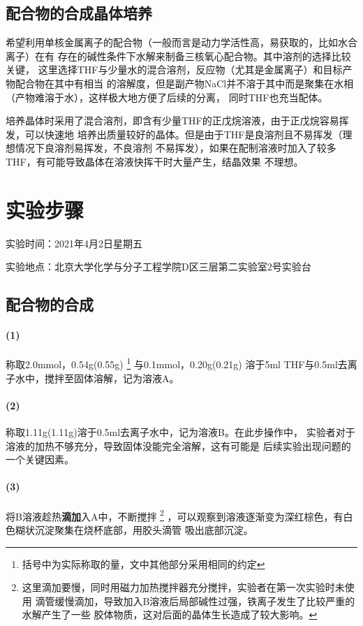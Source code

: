 \documentclass[a4paper,zihao=5,UTF8]{ctexart}
\begin{document}
	\subsection{配合物的合成晶体培养}
	希望利用单核金属离子的配合物（一般而言是动力学活性高，易获取的，比如水合离子）在有
	存在的碱性条件下水解来制备三核氧心配合物。其中溶剂的选择比较关键，
	这里选择THF与少量水的混合溶剂，反应物（尤其是金属离子）和目标产物配合物在其中有相当
	的溶解度，但是副产物NaCl并不溶于其中而是聚集在水相（产物难溶于水），这样极大地方便了后续的分离，
	同时THF也充当配体。
	\par 
	培养晶体时采用了混合溶剂，即含有少量THF的正戊烷溶液，由于正戊烷容易挥发，可以快速地
	培养出质量较好的晶体。但是由于THF是良溶剂且不易挥发（理想情况下良溶剂易挥发，不良溶剂
	不易挥发），如果在配制溶液时加入了较多THF，有可能导致晶体在溶液快挥干时大量产生，结晶效果
	不理想。
	\section{实验步骤}
	实验时间：2021年4月2日星期五\\
	\par 
	实验地点：北京大学化学与分子工程学院D区三层第二实验室2号实验台
	\subsection{配合物的合成}
	\paragraph{(1)}称取2.0mmol，0.54g(0.55g)
	\footnote{括号中为实际称取的量，文中其他部分采用相同的约定}
	与0.1mmol，0.20g(0.21g)
	溶于5ml THF与0.5ml去离子水中，搅拌至固体溶解，记为溶液A。
	\paragraph{(2)}
	称取1.11g(1.11g)溶于0.5ml去离子水中，记为溶液B。在此步操作中，
	实验者对于溶液的加热不够充分，导致固体没能完全溶解，这有可能是
	后续实验出现问题的一个关键因素。
	\paragraph{(3)}
	将B溶液趁热\textbf{滴加}入A中，不断搅拌
	\footnote{这里滴加要慢，同时用磁力加热搅拌器充分搅拌，实验者在第一次实验时未使用
	滴管缓慢滴加，导致加入B溶液后局部碱性过强，铁离子发生了比较严重的水解产生了一些
	胶体物质，这对后面的晶体生长造成了较大影响。}
	，可以观察到溶液逐渐变为深红棕色，有白色糊状沉淀聚集在烧杯底部，用胶头滴管
	吸出底部沉淀。
\end{document}
